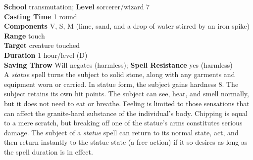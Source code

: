 \textbf{School} transmutation; \textbf{Level} sorcerer/wizard 7\\
\textbf{Casting Time} 1 round\\
\textbf{Components} V, S, M (lime, sand, and a drop of water stirred by an iron spike)\\
\textbf{Range} touch\\
\textbf{Target} creature touched\\
\textbf{Duration} 1 hour/level (D)\\
\textbf{Saving Throw }Will negates (harmless); \textbf{Spell Resistance} yes (harmless)\\
A \textit{statue }spell turns the subject to solid stone, along with any garments and equipment worn or carried. In statue form, the subject gains hardness 8. The subject retains its own hit points. The subject can see, hear, and smell normally, but it does not need to eat or breathe. Feeling is limited to those sensations that can affect the granite-hard substance of the individual's body. Chipping is equal to a mere scratch, but breaking off one of the statue's arms constitutes serious damage. The subject of a \textit{statue }spell can return to its normal state, act, and then return instantly to the statue state (a free action) if it so desires as long as the spell duration is in effect.\\
